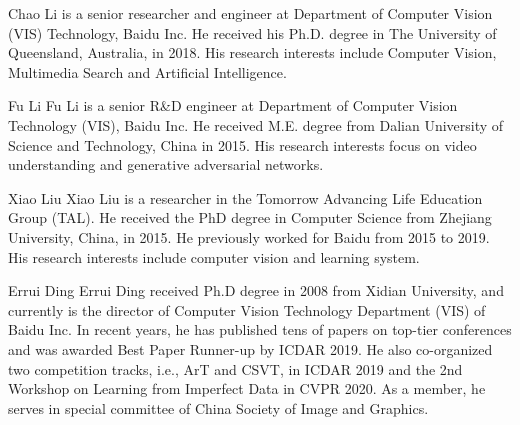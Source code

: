 \documentclass[journal]{IEEEtran}
\begin{document}
\vspace{-60px}
\begin{IEEEbiography}{Chao Li} is a senior researcher and engineer at Department of Computer Vision (VIS) Technology, Baidu Inc. He received his Ph.D. degree in The University of Queensland, Australia, in 2018. His research interests include Computer Vision, Multimedia Search and Artificial Intelligence. 
\end{IEEEbiography}

\vspace{-60px}
\begin{IEEEbiography}{Fu Li}
Fu Li is a senior R\&D engineer at Department of Computer Vision Technology (VIS), Baidu Inc. He received M.E. degree from Dalian University of Science and Technology, China in 2015. His research interests focus on video understanding and generative adversarial networks.
\end{IEEEbiography}

\vspace{-60px}
\begin{IEEEbiography}{Xiao Liu}
Xiao Liu is a researcher in the Tomorrow Advancing Life Education Group (TAL). He received the PhD degree in Computer Science from Zhejiang University, China, in 2015. He previously worked for Baidu from 2015 to 2019.
His research interests include computer vision and learning system.
\end{IEEEbiography}



\vspace{-60px}
\begin{IEEEbiography}{Errui Ding}
Errui Ding received Ph.D degree in 2008 from Xidian University, and currently is the director of Computer Vision Technology Department (VIS) of Baidu Inc.  In recent years, he has published tens of papers on top-tier conferences and was awarded Best Paper Runner-up by ICDAR 2019. He also co-organized two competition tracks, i.e., ArT and CSVT, in ICDAR 2019 and the 2nd Workshop on Learning from Imperfect Data in CVPR 2020. As a member, he serves in special committee of China Society of Image and Graphics.
\end{IEEEbiography}
\end{document}
